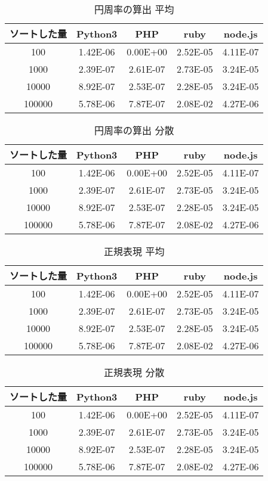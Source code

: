 \begin{table}[tb]
\centering
\begin{tabular}{|c||c|c|c|c|}
\hline
ソートした量&Python3&PHP&ruby&node.js\\ \hline
100     &1.42E-06	&0.00E+00	&2.52E-05	&4.11E-07\\ \hline
1000	&2.39E-07	&2.61E-07	&2.73E-05	&3.24E-05\\ \hline
10000	&8.92E-07	&2.53E-07	&2.28E-05	&3.24E-05\\ \hline
100000	&5.78E-06	&7.87E-07	&2.08E-02	&4.27E-06\\ \hline
\end{tabular}
\caption{円周率の算出 平均}
\label{table:p-average}
\end{table}

\begin{table}[tb]
\centering
\begin{tabular}{|c||c|c|c|c|}
\hline
ソートした量&Python3&PHP&ruby&node.js\\ \hline
100     &1.42E-06	&0.00E+00	&2.52E-05	&4.11E-07\\ \hline
1000	&2.39E-07	&2.61E-07	&2.73E-05	&3.24E-05\\ \hline
10000	&8.92E-07	&2.53E-07	&2.28E-05	&3.24E-05\\ \hline
100000	&5.78E-06	&7.87E-07	&2.08E-02	&4.27E-06\\ \hline
\end{tabular}
\caption{円周率の算出 分散}
\label{table:p-dispersion}
\end{table}

\clearpage

\begin{table}[tb]
\centering
\begin{tabular}{|c||c|c|c|c|}
\hline
ソートした量&Python3&PHP&ruby&node.js\\ \hline
100     &1.42E-06	&0.00E+00	&2.52E-05	&4.11E-07\\ \hline
1000	&2.39E-07	&2.61E-07	&2.73E-05	&3.24E-05\\ \hline
10000	&8.92E-07	&2.53E-07	&2.28E-05	&3.24E-05\\ \hline
100000	&5.78E-06	&7.87E-07	&2.08E-02	&4.27E-06\\ \hline
\end{tabular}
\caption{正規表現 平均}
\label{table:s-average}
\end{table}

\begin{table}[tb]
\centering
\begin{tabular}{|c||c|c|c|c|}
\hline
ソートした量&Python3&PHP&ruby&node.js\\ \hline
100     &1.42E-06	&0.00E+00	&2.52E-05	&4.11E-07\\ \hline
1000	&2.39E-07	&2.61E-07	&2.73E-05	&3.24E-05\\ \hline
10000	&8.92E-07	&2.53E-07	&2.28E-05	&3.24E-05\\ \hline
100000	&5.78E-06	&7.87E-07	&2.08E-02	&4.27E-06\\ \hline
\end{tabular}
\caption{正規表現 分散}
\label{table:s-dispersion}
\end{table}